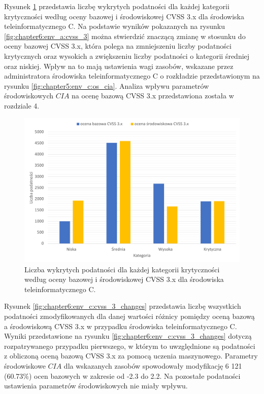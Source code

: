 \bigbreak
Rysunek \ref{fig:chapter6:env_c:cvss_3} przedstawia liczbę wykrytych podatności dla każdej kategorii krytyczności według oceny bazowej i środowiskowej CVSS 3.x dla środowiska teleinformatycznego C. Na podstawie wyników pokazanych na rysunku \ref{fig:chapter6:env_a:cvss_3} można stwierdzić znaczącą zmianę w stosunku do oceny bazowej CVSS 3.x, która polega na zmniejszeniu liczby podatności krytycznych oraz wysokich a zwiększeniu liczby podatności o kategorii średniej oraz niskiej. Wpływ na to mają ustawienia wagi zasobów, wskazane przez administratora środowiska teleinformatycznego C o rozkładzie przedstawionym na rysunku \ref{fig:chapter5:env_c:os_cia}. Analiza wpływu parametrów środowiskowych $CIA$ na ocenę bazową CVSS 3.x przedstawiona została w rozdziale 4.

\begin{figure}[!ht]
\centering
\includegraphics[width=.9\textwidth]{Chapters/Eksperymenty/env_C_results/cvss_3_ml.pdf}
\caption{Liczba wykrytych podatności dla każdej kategorii krytyczności według oceny bazowej i środowiskowej CVSS 3.x dla środowiska teleinformatycznego C.}
\label{fig:chapter6:env_c:cvss_3}
\end{figure}

\bigbreak
Rysunek \ref{fig:chapter6:env_c:cvss_3_changes} przedstawia liczbę wszystkich podatności zmodyfikowanych dla danej wartości różnicy pomiędzy oceną bazową a środowiskową CVSS 3.x w przypadku środowiska teleinformatycznego C. Wyniki przedstawione na rysunku \ref{fig:chapter6:env_c:cvss_3_changes} dotyczą rozpatrywanego przypadku pierwszego, w którym to uwzględnione są podatności z obliczoną oceną bazową CVSS 3.x za pomocą uczenia maszynowego. Parametry środowiskowe $CIA$ dla wskazanych zasobów spowodowały modyfikację  6 121 (60.73\%) ocen bazowych w zakresie od -2.3 do 2.2. Na pozostałe podatności ustawienia parametrów środowiskowych nie miały wpływu.

